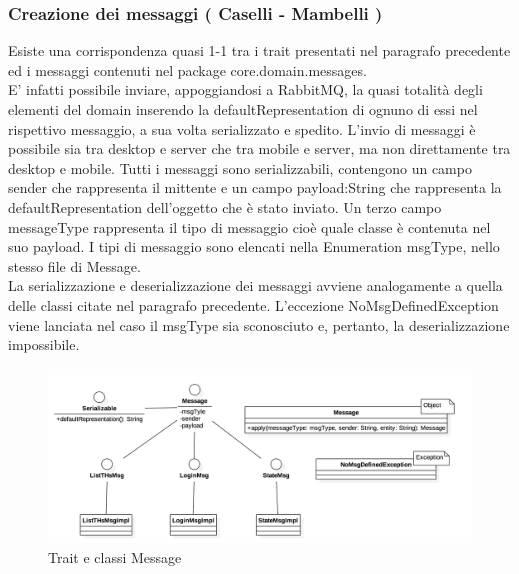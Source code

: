 \documentclass[12pt, italian]{article}
\begin{document}
\subsubsection{Creazione dei messaggi ( Caselli - Mambelli )}
Esiste una corrispondenza quasi 1-1 tra i trait presentati nel paragrafo precedente ed i messaggi contenuti nel package core.domain.messages.\\
E' infatti possibile inviare, appoggiandosi a RabbitMQ, la quasi totalità degli elementi del domain inserendo la defaultRepresentation di ognuno di essi nel rispettivo messaggio, a sua volta serializzato e spedito.
L'invio di messaggi è possibile sia tra desktop e server che tra mobile e server, ma non direttamente tra desktop e mobile.
Tutti i messaggi sono serializzabili, contengono un campo sender che rappresenta il mittente e un campo payload:String che rappresenta la defaultRepresentation dell'oggetto che è stato inviato.
Un terzo campo messageType rappresenta il tipo di messaggio cioè quale classe è contenuta nel suo payload.
I tipi di messaggio sono elencati nella Enumeration msgType, nello stesso file di Message.\\
La serializzazione e deserializzazione dei messaggi avviene analogamente a quella delle classi citate nel paragrafo precedente.
L'eccezione NoMsgDefinedException viene lanciata nel caso il msgType sia sconosciuto e, pertanto, la deserializzazione impossibile.

\begin{figure}[H]
	\centering
	\includegraphics[width=1\textwidth]{img/diagram02.png}
	\caption{Trait e classi Message}
\end{figure}

\newpage
\end{document}
